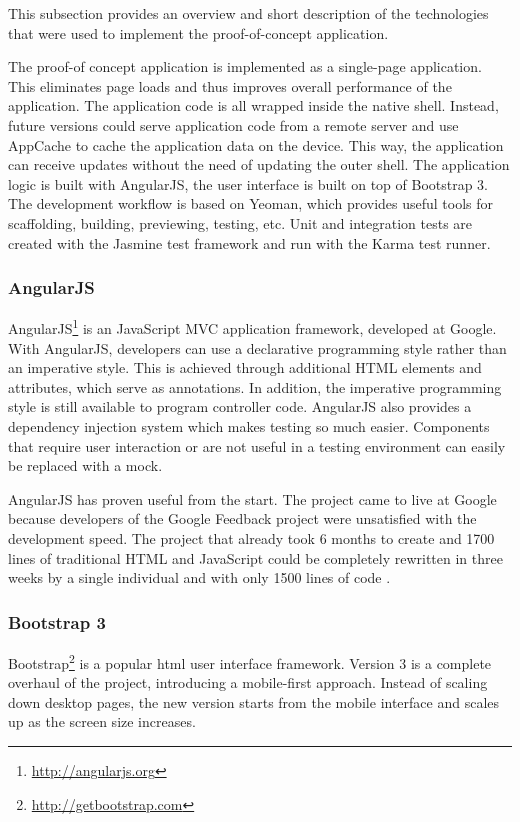 This subsection provides an overview and short description of the technologies that were used to implement the proof-of-concept application. 

The proof-of concept application is implemented as a single-page application. This eliminates page loads and thus improves overall performance of the application. The application code is all wrapped inside the native shell. Instead, future versions could serve application code from a remote server and use AppCache to cache the application data on the device. This way, the application can receive updates without the need of updating the outer shell. The application logic is built with AngularJS, the user interface is built on top of Bootstrap 3. The development workflow is based on Yeoman, which provides useful tools for scaffolding, building, previewing, testing, etc. Unit and integration tests are created with the Jasmine test framework and run with the Karma test runner.

\subsubsection{AngularJS}

AngularJS\footnote{\url{http://angularjs.org}} is an JavaScript MVC application framework, developed at Google. With AngularJS, developers can use a declarative programming style rather than an imperative style. This is achieved through additional HTML elements and attributes, which serve as annotations. In addition, the imperative programming style is still available to program controller code. AngularJS also provides a dependency injection system which makes testing so much easier. Components that require user interaction or are not useful in a testing environment can easily be replaced with a mock.

AngularJS has proven useful from the start. The project came to live at Google because developers of the Google Feedback project were unsatisfied with the development speed. The project that already took 6 months to create and 1700 lines of traditional HTML and JavaScript could be completely rewritten in three weeks by a single individual and with only 1500 lines of code \cite{Green:2013}.

\subsubsection{Bootstrap 3}

Bootstrap\footnote{\url{http://getbootstrap.com}} is a popular html user interface framework. Version 3 is a complete overhaul of the project, introducing a mobile-first approach. Instead of scaling down desktop pages, the new version starts from the mobile interface and scales up as the screen size increases. 


